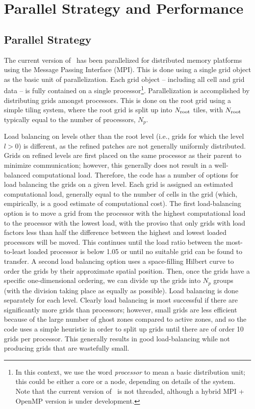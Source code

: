 \section{Parallel Strategy and Performance}
\label{sec.parallel}

\subsection{Parallel Strategy}

The current version of \enzo\ has been parallelized for distributed
memory platforms using the Message Passing Interface (MPI).  This is
done using a single grid object as the basic unit of parallelization.
Each grid object -- including all cell and grid data -- is fully
contained on a single processor\footnote{In this context, we use the
word {\it processor} to mean a basic distribution unit; this could be
either a core or a node, depending on details of the system.  Note
that the current version of \enzo\ is not threaded, although a hybrid
MPI + OpenMP version is under development.}.  
Parallelization is
accomplished by distributing grids amongst processors.  This is done
on the root grid using a simple tiling system, where the root grid is
split up into $N_{\rm root}$ tiles, with $N_{\rm root}$ typically
equal to the number of processors, $N_p$.

Load balancing on levels other than the root level (i.e., grids for
which the level $l > 0$) is different, as the refined patches are not
generally uniformly distributed.  Grids on refined levels are first
placed on the same processor as their parent to minimize
communication; however, this generally does not result in a
well-balanced computational load.  Therefore, the code has a number of options for
load balancing the grids on a given level. Each grid is assigned an
estimated computational load, generally equal to the number of cells in the grid (which,
empirically, is a good estimate of computational cost).  The first
load-balancing option is to move a grid from the processor with the
highest computational load to the processor with the lowest load, with the proviso
that only grids with load factors less than half the difference
between the highest and lowest loaded processors will be moved.  This
continues until the load ratio between the most-to-least loaded
processor is below 1.05 or until no suitable grid can be found to
transfer.  A second load balancing option uses a space-filling Hilbert
curve to order the grids by their approximate spatial position.  Then,
once the grids have a specific one-dimensional ordering, we can divide
up the grids into $N_p$ groups (with the division taking place as
equally as possible).  Load balancing is done separately for each
level.  Clearly load balancing is most successful if there are
significantly more grids than processors; however, small grids are
less efficient because of the large number of ghost zones compared to
active zones, and so the code uses a
simple heuristic in order to split up grids until there are of order
10 grids per processor.  This generally results in good load-balancing
while not producing grids that are wastefully small.

